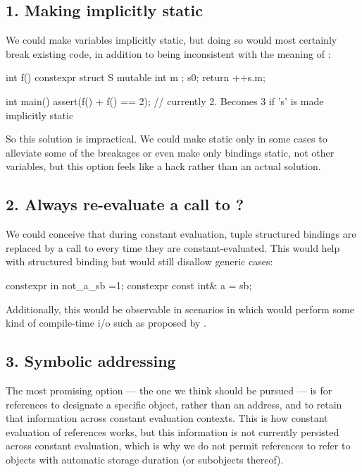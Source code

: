 \documentclass{wg21}
\begin{document}
\subsection{1. Making  implicitly static}

We could make  variables implicitly static, but
doing so would most certainly break existing code, in addition to being inconsistent with the meaning of :

\begin{colorblock}
int f() {
    constexpr struct S {
        mutable int m ;
    } s{0};
    return ++s.m;
}

int main() {
    assert(f() + f() == 2); // currently 2. Becomes 3 if 's' is made implicitly static
}
\end{colorblock}

So this solution is impractical. We could make  static only in some cases to alleviate some of the breakages or even make only  bindings static, not other variables, but this option feels like a hack rather than an actual solution.

\subsection{2. Always re-evaluate a call to ?}

We could conceive that during constant evaluation, tuple structured bindings are replaced by a call to  every time they are constant-evaluated.
This would help with  structured binding but would still disallow generic cases:

\begin{colorblock}
constexpr in not_a_sb =1;
constexpr const int&  a = sb;
\end{colorblock}

Additionally, this would be observable in scenarios in which  would perform some kind of compile-time i/o such as proposed by .

\subsection{3. Symbolic addressing}

The most promising option --- the one we think should be pursued --- is for  references to designate a specific object, rather than an address,
and to retain that information across constant evaluation contexts.
This is how constant evaluation of references works, but this information is not currently persisted across constant evaluation, which is why we do not permit
 references to refer to objects with automatic storage duration (or subobjects thereof).
\end{document}
